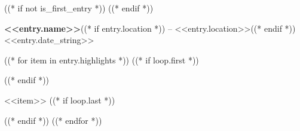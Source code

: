 ((* if not is_first_entry *))
\vspace{8pt}
((* endif *))

\textbf{<<entry.name>>}((* if entry.location *)) -- <<entry.location>>((* endif *)) \hfill <<entry.date_string>>

((* for item in entry.highlights *))
    ((* if loop.first *))
\begin{highlights}
    ((* endif *))
\item <<item>>
    ((* if loop.last *))
\end{highlights}
    ((* endif *))
((* endfor *))